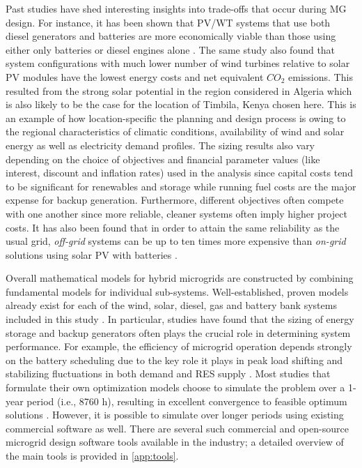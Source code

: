 \documentclass[final,3p,times]{elsarticle}
\begin{document}
Past studies have shed interesting insights into trade-offs that occur during MG design. For instance, it has been shown that PV/WT systems that use both diesel generators and batteries are more economically viable than those using either only batteries or diesel engines alone \cite{kaabeche2014}. The same study also found that system configurations with much lower number of wind turbines relative to solar PV modules have the lowest energy costs and net equivalent $CO_2$ emissions. This resulted from the strong solar potential in the region considered in Algeria \cite{kaabeche2014} which is also likely to be the case for the location of Timbila, Kenya chosen here. This is an example of how location-specific the planning and design process is owing to the regional characteristics of climatic conditions, availability of wind and solar energy as well as electricity demand profiles. The sizing results also vary depending on the choice of objectives and financial parameter values (like interest, discount and inflation rates) used in the analysis since capital costs tend to be significant for renewables and storage while running fuel costs are the major expense for backup generation. Furthermore, different objectives often compete with one another since more reliable, cleaner systems often imply higher project costs. It has also been found that in order to attain the same reliability as the usual grid, \textit{off-grid} systems can be up to ten times more expensive than \textit{on-grid} solutions using solar PV with batteries \cite{weng2016}.

Overall mathematical models for hybrid microgrids are constructed by combining fundamental models for individual sub-systems. Well-established, proven models already exist for each of the wind, solar, diesel, gas and battery bank systems included in this study \cite{bhandari2014}. In particular, studies have found that the sizing of energy storage and backup generators often plays the crucial role in determining system performance. For example, the efficiency of microgrid operation depends strongly on the battery scheduling due to the key role it plays in peak load shifting and stabilizing fluctuations in both demand and RES supply \cite{gu2014}. Most studies that formulate their own optimization models choose to simulate the problem over a 1-year period (i.e., 8760 h), resulting in excellent convergence to feasible optimum solutions \cite{logenthiran2010}. However, it is possible to simulate over longer periods using existing commercial software as well. There are several such commercial and open-source microgrid design software tools available in the industry; a detailed overview of the main tools is provided in \cref{app:tools}.
\end{document}
